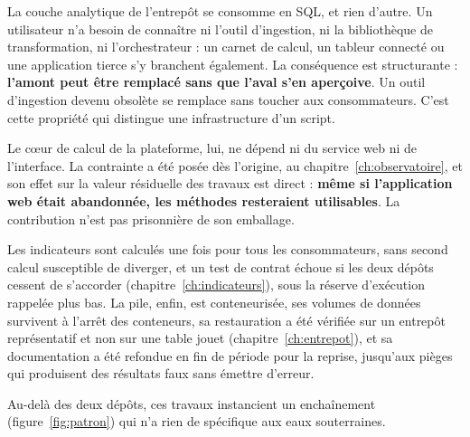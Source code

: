 La couche analytique de l'entrepôt se consomme en SQL, et rien d'autre. Un utilisateur n'a besoin
de connaître ni l'outil d'ingestion, ni la bibliothèque de transformation, ni l'orchestrateur :
un carnet de calcul, un tableur connecté ou une application tierce s'y branchent également. La
conséquence est structurante : \textbf{l'amont peut être remplacé sans que l'aval s'en
aperçoive}. Un outil d'ingestion devenu obsolète se remplace sans toucher aux consommateurs.
C'est cette propriété qui distingue une infrastructure d'un script.

Le cœur de calcul de la plateforme, lui, ne dépend ni du service web ni de l'interface. La contrainte a été posée
dès l'origine, au chapitre~\ref{ch:observatoire}, et son effet sur la valeur résiduelle des
travaux est direct : \textbf{même si l'application web était abandonnée, les méthodes
resteraient utilisables}. La contribution n'est pas prisonnière de son emballage.

Les indicateurs sont calculés une fois pour tous les consommateurs, sans second calcul
susceptible de diverger, et un test de contrat échoue si les deux dépôts cessent de s'accorder
(chapitre~\ref{ch:indicateurs}), sous la réserve d'exécution rappelée plus bas. La pile, enfin, est conteneurisée, ses volumes de
données survivent à l'arrêt des conteneurs, sa restauration a été vérifiée sur un entrepôt
représentatif et non sur une table jouet (chapitre~\ref{ch:entrepot}), et sa documentation a été
refondue en fin de période pour la reprise, jusqu'aux pièges qui produisent des résultats faux
sans émettre d'erreur.

Au-delà des deux dépôts, ces travaux instancient un enchaînement (figure~\ref{fig:patron}) qui
n'a rien de spécifique aux eaux souterraines.

